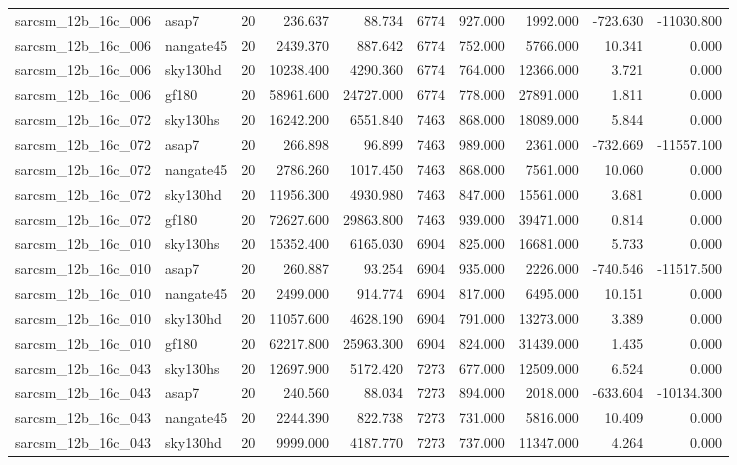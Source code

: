 \begin{longtable}{llrrrrrrrr}
sarcsm\_12b\_16c\_006 & asap7 & 20 & 236.637 & 88.734 & 6774 & 927.000 & 1992.000 & -723.630 & -11030.800 \\
sarcsm\_12b\_16c\_006 & nangate45 & 20 & 2439.370 & 887.642 & 6774 & 752.000 & 5766.000 & 10.341 & 0.000 \\
sarcsm\_12b\_16c\_006 & sky130hd & 20 & 10238.400 & 4290.360 & 6774 & 764.000 & 12366.000 & 3.721 & 0.000 \\
sarcsm\_12b\_16c\_006 & gf180 & 20 & 58961.600 & 24727.000 & 6774 & 778.000 & 27891.000 & 1.811 & 0.000 \\
sarcsm\_12b\_16c\_072 & sky130hs & 20 & 16242.200 & 6551.840 & 7463 & 868.000 & 18089.000 & 5.844 & 0.000 \\
sarcsm\_12b\_16c\_072 & asap7 & 20 & 266.898 & 96.899 & 7463 & 989.000 & 2361.000 & -732.669 & -11557.100 \\
sarcsm\_12b\_16c\_072 & nangate45 & 20 & 2786.260 & 1017.450 & 7463 & 868.000 & 7561.000 & 10.060 & 0.000 \\
sarcsm\_12b\_16c\_072 & sky130hd & 20 & 11956.300 & 4930.980 & 7463 & 847.000 & 15561.000 & 3.681 & 0.000 \\
sarcsm\_12b\_16c\_072 & gf180 & 20 & 72627.600 & 29863.800 & 7463 & 939.000 & 39471.000 & 0.814 & 0.000 \\
sarcsm\_12b\_16c\_010 & sky130hs & 20 & 15352.400 & 6165.030 & 6904 & 825.000 & 16681.000 & 5.733 & 0.000 \\
sarcsm\_12b\_16c\_010 & asap7 & 20 & 260.887 & 93.254 & 6904 & 935.000 & 2226.000 & -740.546 & -11517.500 \\
sarcsm\_12b\_16c\_010 & nangate45 & 20 & 2499.000 & 914.774 & 6904 & 817.000 & 6495.000 & 10.151 & 0.000 \\
sarcsm\_12b\_16c\_010 & sky130hd & 20 & 11057.600 & 4628.190 & 6904 & 791.000 & 13273.000 & 3.389 & 0.000 \\
sarcsm\_12b\_16c\_010 & gf180 & 20 & 62217.800 & 25963.300 & 6904 & 824.000 & 31439.000 & 1.435 & 0.000 \\
sarcsm\_12b\_16c\_043 & sky130hs & 20 & 12697.900 & 5172.420 & 7273 & 677.000 & 12509.000 & 6.524 & 0.000 \\
sarcsm\_12b\_16c\_043 & asap7 & 20 & 240.560 & 88.034 & 7273 & 894.000 & 2018.000 & -633.604 & -10134.300 \\
sarcsm\_12b\_16c\_043 & nangate45 & 20 & 2244.390 & 822.738 & 7273 & 731.000 & 5816.000 & 10.409 & 0.000 \\
sarcsm\_12b\_16c\_043 & sky130hd & 20 & 9999.000 & 4187.770 & 7273 & 737.000 & 11347.000 & 4.264 & 0.000 \\

\end{longtable}
